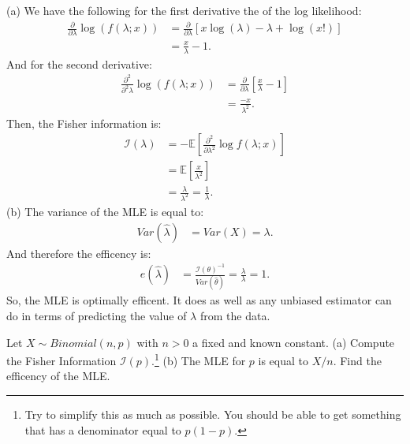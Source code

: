 
(a) We have the following for the first derivative the of the log likelihood:
\begin{align*}
\frac{\partial}{\partial \lambda} \log(f(\lambda; x))
&= \frac{\partial}{\partial \lambda} \left[ x \log(\lambda) - \lambda + \log(x!) \right] \\
&= \frac{x}{\lambda} - 1.
\end{align*}
And for the second derivative:
\begin{align*}
\frac{\partial^2}{\partial^2 \lambda} \log(f(\lambda; x))
&= \frac{\partial}{\partial \lambda} \left[ \frac{x}{\lambda} - 1 \right] \\
&= \frac{-x}{\lambda^2}.
\end{align*}
Then, the Fisher information is:
\begin{align*}
\mathcal{I}(\lambda) &= - \mathbb{E} \left[ \frac{\partial^2}{\partial \lambda^2} \log f(\lambda; x) \right] \\
&= \mathbb{E} \left[ \frac{x}{\lambda^2} \right] \\
&= \frac{\lambda}{\lambda^2} = \frac{1}{\lambda}.
\end{align*}
(b) The variance of the MLE is equal to:
\begin{align*}
Var(\hat{\lambda}) &= Var(X) = \lambda.
\end{align*}
And therefore the efficency is:
\begin{align*}
e(\hat{\lambda}) &= \frac{\mathcal{I}(\theta)^{-1}}{Var(\widehat{\theta})} = \frac{\lambda}{\lambda} = 1.
\end{align*}
So, the MLE is optimally efficent. It does as well as any unbiased estimator can do in
terms of predicting the value of $\lambda$ from the data.


Let $X \sim Binomial(n, p)$ with $n>0$ a fixed and known constant.
(a) Compute the Fisher Information $\mathcal{I}(p)$.\footnote{
  Try to simplify this as much as possible. You should be able to
  get something that has a denominator equal to $p(1-p)$.
} (b) The MLE for $p$ is
equal to $X/n$. Find the efficency of the MLE.



